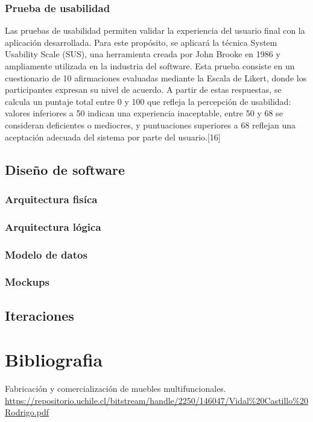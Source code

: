 \documentclass[12pt,oneside]{article}
\begin{document}
\subsubsection{Prueba de usabilidad}
Las pruebas de usabilidad permiten validar la experiencia del usuario final con la aplicación desarrollada. Para este propósito, se aplicará la técnica System Usability Scale (SUS), una herramienta creada por John Brooke en 1986 y ampliamente utilizada en la industria del software. Esta prueba consiste en un cuestionario de 10 afirmaciones evaluadas mediante la Escala de Likert, donde los participantes expresan su nivel de acuerdo. A partir de estas respuestas, se calcula un puntaje total entre 0 y 100 que refleja la percepción de usabilidad: valores inferiores a 50 indican una experiencia inaceptable, entre 50 y 68 se consideran deficientes o mediocres, y puntuaciones superiores a 68 reflejan una aceptación adecuada del sistema por parte del usuario.[16]
\endgroup

\subsection{Diseño de software}

\subsubsection{Arquitectura fisíca}

\subsubsection{Arquitectura lógica}

\subsubsection{Modelo de datos}

\subsubsection{Mockups}

\subsection{Iteraciones}


\section{Bibliografia}
\begingroup
\small
\noindent [1] Fabricación y comercialización de muebles multifuncionales. \url{https://repositorio.uchile.cl/bitstream/handle/2250/146047/Vidal%20Castillo%20Rodrigo.pdf} \vspace{0.5em}
\end{document}
